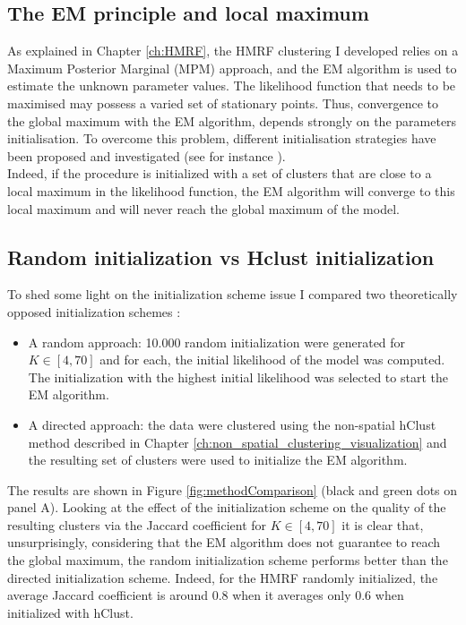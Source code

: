 	\subsection{The EM principle and local maximum}
As explained in Chapter \ref{ch:HMRF}, the HMRF clustering I developed relies on a Maximum Posterior Marginal (MPM) approach, and the EM algorithm is used to estimate the unknown parameter values. The likelihood function that needs to be maximised may possess a varied set of stationary points. Thus, convergence to the global maximum with the EM algorithm, depends strongly on the parameters initialisation. To overcome this problem, different initialisation strategies have been proposed and investigated (see for instance \cite{biernacki03,karlis03,mclachlan04}).\\

Indeed, if the procedure is initialized with a set of clusters that are close to a local maximum in the likelihood function, the EM algorithm will converge to this local maximum and will never reach the global maximum of the model.

	\subsection{Random initialization vs Hclust initialization}
	To shed some light on the initialization scheme issue I compared two theoretically opposed initialization schemes :
\begin{itemize}
	\item A random approach: 10.000 random initialization were generated for $K \in [4,70]$ and for each, the initial likelihood of the model was computed. The initialization with the highest initial likelihood was selected to start the EM algorithm.
	\item A directed approach: the data were clustered using the non-spatial hClust method described in Chapter \ref{ch:non_spatial_clustering_visualization} and the resulting set of clusters were used to initialize the EM algorithm.
\end{itemize}

The results are shown in Figure \ref{fig:methodComparison} (black and green dots on panel A). Looking at the effect of the initialization scheme on the quality of the resulting clusters via the Jaccard coefficient for $K \in [4,70]$ it is clear that, unsurprisingly, considering that the EM algorithm does not guarantee to reach the global maximum, the random initialization scheme performs better than the directed initialization scheme. Indeed, for the HMRF randomly initialized, the average Jaccard coefficient is around $0.8$ when it averages only $0.6$ when initialized with hClust.\\

